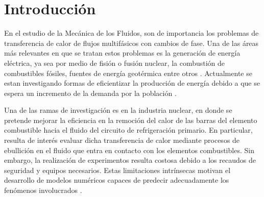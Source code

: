 \chapter{Introducción}
\graphicspath{{figs/cap1/}}
\label{cap1}



En el estudio de la Mecánica de los Fluidos, son de importancia los problemas de transferencia de calor de flujos multifásicos con cambios de fase. Una de las áreas más relevantes en que se tratan estos problemas es la generación de energía eléctrica, ya sea por medio de fisión o fusión nuclear, la combustión de combustibles fósiles, fuentes de energía geotérmica entre otros \cite{incropera2007fundamentals}. Actualmente se estan investigando formas de eficientizar la producción de energía debido a que se espera un incremento de la demanda por la población \cite{schiffer2018world}.

Una de las ramas de investigación es en la industria nuclear, en donde se pretende mejorar la eficiencia en la remoción del calor de las barras del elemento combustible hacia el fluido del circuito de refrigeración primario. En particular, resulta de interés evaluar dicha transferencia de calor mediante procesos de ebullición en el fluido que entra en contacto con los elementos combustibles. Sin embargo, la realización de experimentos resulta costosa debido a los recaudos de seguridad y equipos necesarios. Estas limitaciones intrínsecas motivan el desarrollo de modelos numéricos capaces de predecir adecuadamente los fenómenos involucrados \cite{zhang2011numerical}. 



